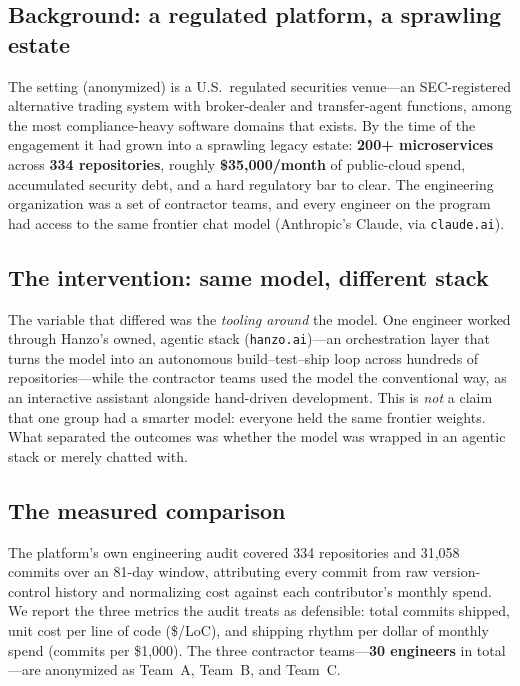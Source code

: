 \documentclass[11pt,letterpaper]{article}
\begin{document}
\subsection{Background: a regulated platform, a sprawling estate}
The setting (anonymized) is a U.S.\ regulated securities venue---an SEC-registered
alternative trading system with broker-dealer and transfer-agent functions, among
the most compliance-heavy software domains that exists. By the time of the
engagement it had grown into a sprawling legacy estate: \textbf{200+ microservices}
across \textbf{334 repositories}, roughly \textbf{\$35{,}000/month} of public-cloud
spend, accumulated security debt, and a hard regulatory bar to clear. The
engineering organization was a set of contractor teams, and every engineer on the
program had access to the same frontier chat model (Anthropic's Claude, via
\texttt{claude.ai}).

\subsection{The intervention: same model, different stack}
The variable that differed was the \emph{tooling around} the model. One engineer
worked through Hanzo's owned, agentic stack (\texttt{hanzo.ai})---an orchestration
layer that turns the model into an autonomous build--test--ship loop across hundreds
of repositories---while the contractor teams used the model the conventional way, as
an interactive assistant alongside hand-driven development. This is \emph{not} a
claim that one group had a smarter model: everyone held the same frontier weights.
What separated the outcomes was whether the model was wrapped in an agentic stack or
merely chatted with.

\subsection{The measured comparison}
The platform's own engineering audit covered 334 repositories and
31{,}058 commits over an 81-day window, attributing every commit from raw version-control
history and normalizing cost against each contributor's monthly spend. We report
the three metrics the audit treats as defensible: total commits shipped, unit cost
per line of code (\$/LoC), and shipping rhythm per dollar of monthly spend
(commits per \$1{,}000). The three contractor teams---\textbf{30 engineers} in
total---are anonymized as Team~A, Team~B, and Team~C.
\end{document}
